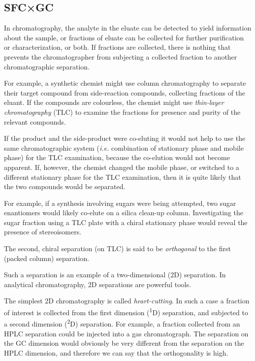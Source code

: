\subsection{SFC×GC}

In chromatography, the analyte in the eluate can be detected to yield
information about the sample, or fractions of eluate can be collected for
further purification or characterization, or both. If fractions are collected,
there is nothing that prevents the chromatographer from subjecting a collected
fraction to another chromatographic separation.

For example, a synthetic chemist might use column chromatography to separate
their target compound from side-reaction compounds, collecting fractions of the
eluant. If the compounds are colourless, the chemist might use
\textit{thin-layer chromatography} (TLC) to examine the fractions for presence
and purity of the relevant compounds.

If the product and the side-product were co-eluting it would not help to use the
same chromatographic system (\textit{i.e.} combination of stationary phase and
mobile phase) for the TLC examination, because the co-elution would not become
apparent. If, however, the chemist changed the mobile phase, or switched to a
different stationary phase for the TLC examination, then it is quite likely that
the two compounds would be separated. 

For example, if a synthesis involving sugars were being attempted, two sugar
enantiomers would likely co-elute on a silica clean-up column. Investigating the
sugar fraction using a TLC plate with a chiral stationary phase
would reveal the presence of stereoisomers.

The second, chiral separation (on TLC) is said to be \textit{orthogonal} to the
first (packed column) separation.

Such a separation is an example of a two-dimensional (2D) separation. In
analytical chromatography, 2D separations are powerful tools.

The simplest 2D chromatography is called \textit{heart-cutting}. In such a case
a fraction of interest is collected from the first dimension
(\textsuperscript{1}D) separation, and subjected to a second dimension
(\textsuperscript{2}D) separation. For example, a fraction collected from an
HPLC separation could be injected into a gas chromatograph. The separation on
the GC dimension would obviously be very different from the separation on the
HPLC dimension, and therefore we can say that the orthogonality is high.


